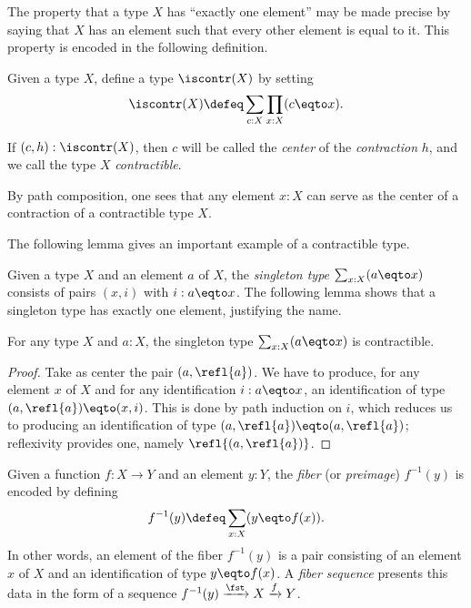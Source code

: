 The property that a type $X$ has ``exactly one element'' may be made precise
by saying that $X$ has an element such that every other element is equal to it.
This property is encoded in the following definition.

\begin{definition}
  \label{def:contractible}
  Given a type $X$, define a type $\iscontr(X)$ by setting
  \[
    \iscontr(X) \defeq \sum_{c:X} \prod_{x:X} (c \eqto x).\qedhere
  \]
\end{definition}

If $ (c,h) : \iscontr(X) $, then $c$ will be called the \emph{center} of
the \emph{contraction} $h$, and we call the type $X$ \emph{contractible}.

By path composition, one sees that any element $x : X$ can serve as the center of a contraction of a contractible type $X$.

The following lemma gives an important example of a contractible type.

Given a type $X$ and an element $a$ of $X$,
the \emph{singleton type} $\sum_{x:X} (a \eqto x)$
consists of pairs $(x,i)$ with $i: a \eqto x$. The following lemma shows that a singleton type has exactly one element, justifying the name.

\begin{lemma}\label{lem:thepathspaceiscontractible}
For any type $X$ and $a:X$, the singleton type $\sum_{x:X} (a \eqto x)$ is contractible.
\end{lemma}

\begin{proof}
Take as center the pair $(a,\refl{a})$. We have
to produce, for any element $x$ of $X$ and for any identification
$i: a \eqto x$, an identification of type $(a,\refl{a}) \eqto (x,i)$.  This is done by path induction on $i$, which reduces us to producing
an identification of type $(a,\refl{a}) \eqto (a,\refl{a})$; reflexivity provides one, namely $\refl{(a,\refl{a})}$.
\end{proof}

\begin{definition}
\label{def:fiber}
Given a function $f : X \to Y$ and an element $y:Y$,
the \emph{fiber} (or \emph{preimage}) $f^{-1}(y)$
is encoded by defining $$f^{-1}(y) \defeq \sum_{x:X}(y \eqto f(x)).$$
In other words, an element of the fiber $f^{-1}(y)$ is a pair consisting
of an element $x$ of $X$ and an identification of type $y \eqto f(x)$.
A \emph{fiber sequence} presents this data in the form
of a sequence  $f^{-1}(y)\xrightarrow{\fst} X \xrightarrow{f} Y$.
\end{definition}

